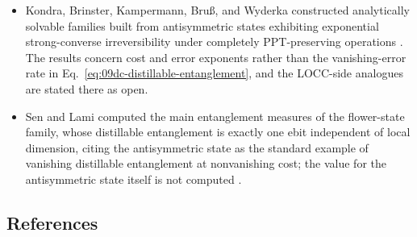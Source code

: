 \begin{itemize}
  \item Kondra, Brinster, Kampermann, Bru{\ss}, and Wyderka constructed
  analytically solvable families built from antisymmetric states exhibiting
  exponential strong-converse irreversibility under completely
  PPT-preserving operations .
  The results concern cost and error exponents rather than the
  vanishing-error rate in Eq.~\eqref{eq:09dc-distillable-entanglement},
  and the LOCC-side analogues are stated there as open.

  \item Sen and Lami computed the main entanglement measures of the
  flower-state family, whose distillable entanglement is exactly one ebit
  independent of local dimension, citing the antisymmetric state as the
  standard example of vanishing distillable entanglement at nonvanishing
  cost; the value for the antisymmetric state itself is not computed
  .
\end{itemize}

\subsection*{References}

